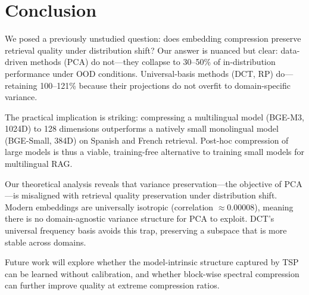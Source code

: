 \documentclass[sigconf]{acmart}
\begin{document}
\section{Conclusion}\label{sec:conclusion}

We posed a previously unstudied question: does embedding compression preserve retrieval quality under distribution shift? Our answer is nuanced but clear: data-driven methods (PCA) do not---they collapse to 30--50\% of in-distribution performance under OOD conditions. Universal-basis methods (DCT, RP) do---retaining 100--121\% because their projections do not overfit to domain-specific variance.

The practical implication is striking: compressing a multilingual model (BGE-M3, 1024D) to 128 dimensions outperforms a natively small monolingual model (BGE-Small, 384D) on Spanish and French retrieval. Post-hoc compression of large models is thus a viable, training-free alternative to training small models for multilingual RAG.

Our theoretical analysis reveals that variance preservation---the objective of PCA---is misaligned with retrieval quality preservation under distribution shift. Modern embeddings are universally isotropic (correlation $\approx 0.00008$), meaning there is no domain-agnostic variance structure for PCA to exploit. DCT's universal frequency basis avoids this trap, preserving a subspace that is more stable across domains.

Future work will explore whether the model-intrinsic structure captured by TSP can be learned without calibration, and whether block-wise spectral compression can further improve quality at extreme compression ratios.



\end{document}
